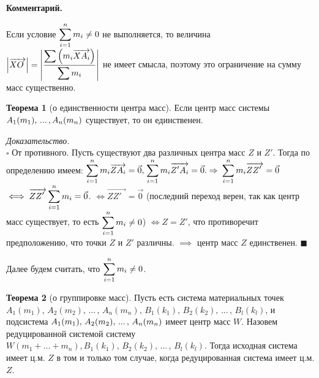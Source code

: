 \documentclass[14pt]{extarticle}
\let\vecarrow\overrightarrow
\theoremstyle{definition}
\theoremstyle{theorem}
\newtheorem*{theorem}{Теорема}
\newtheorem*{remark}{\textup{Комментарий}}
\renewenvironment{proof}
    {\noindent \textit{Доказательство.}\\
	\indent $\square$}
	{ $\blacksquare$\\ }
\renewenvironment{remark}
    {\noindent\textbf{Комментарий.}}
\DeclarePairedDelimiter\abs{\lvert}{\rvert}
\begin{document}
\begin{remark}
	{
    Если условие $\mathlarger{\sum_{i=1}^{n} m_i \ne 0}$ не выполняется,
	то величина \\
	$\mathlarger{\abs*{\vecarrow{XO_{\;}}} = \abs*{\frac{\displaystyle
    \sum \Big(m_i
	\vecarrow{XA_i} \Big)}{\displaystyle \sum m_i}}}$  не имеет смысла,
    поэтому это ограничение на сумму  масс существенно.\par
    }
\end{remark}

\begin{theorem}[о единственности центра масс]
    Если центр масс системы $A_1(m_1), \\  \, ... \, ,A_n(m_n)$
	существует, то он единственен.
\end{theorem}

\begin{proof}
От противного. Пусть существуют два различных центра масс $Z$ и $Z'$.
Тогда по определению имеем: $\mathlarger{\sum_{i=1}^{n} m_i  \vecarrow{ZA_i}
= \vec{0},} \;  \mathlarger{\sum_{i=1}^{n} m_i  \vecarrow{Z'A_i}} = \vec{0}. 
\Rightarrow$ $\mathlarger{\sum_{i=1}^{n} m_i  \vecarrow{ZZ'_{\;\:\,}}} = \vec{0}$
$\iff \mathlarger{\vecarrow{ZZ'_{\;\:\,}} \sum_{i=1}^{n} m_i} = \vec{0}$. 
$\iff \vecarrow{ZZ'_{\;\:\,}} = \vec{0}$ (последний переход верен, 
так как центр масс существует, то есть
$\mathlarger{\sum_{i=1}^{n} m_i \ne 0}$) $\iff Z = Z'$, что противоречит
предположению, что точки $Z$ и $Z'$ различны. $\implies$ центр масс $Z$
единственен.
\end{proof}

\noindent Далее будем считать, что $\mathlarger{\sum_{i=1}^{n} m_i \ne 0}$.

\begin{theorem}[о группировке масс]
Пусть есть система материальных точек $A_1(m_1),  \, A_2(m_2), \, ... \, ,
\, A_n(m_n), \, B_1(k_1), \, B_2(k_2), \, ... \, , \, B_l(k_l)$, 
	и подсистема $A_1(m_1), \\ \, A_2(m_2), \, ... \, , 
	\, A_n(m_n)$ имеет центр масс $W$.
Назовем редуцированной системой систему $W(m_1 + ... + m_n), B_1(k_1),
\, B_2(k_2), \, ... \, , \, B_l(k_l)$. Тогда исходная система имеет ц.м. $Z$
в том и только том случае, когда редуцированная система имеет ц.м. $Z$.
\end{theorem}


\end{document}
